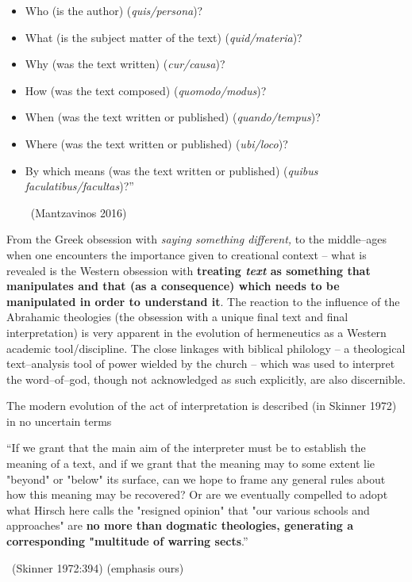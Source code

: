 \begin{itemize}
\itemsep=0pt
\item Who (is the author) (\textit{quis/persona})?

 \item What (is the subject matter of the text) (\textit{quid/materia})?

 \item Why (was the text written) (\textit{cur/causa})?

 \item How (was the text composed) (\textit{quomodo/modus})?

 \item When (was the text written or published) (\textit{quando/tempus})?

 \item Where (was the text written or published) (\textit{ubi/loco})?

 \item By which means (was the text written or published) (\textit{quibus faculatibus/facultas})?”

~\hfill (Mantzavinos 2016)

\end{itemize}

From the Greek obsession with \textit{saying something different,} to the middle–ages when one encounters the importance given to creational context – what is revealed is the Western obsession with \textbf{treating \textit{text} as something that manipulates and that (as a consequence) which needs to be manipulated in order to understand it}. The reaction to the influence of the Abrahamic theologies (the obsession with a unique final text and final interpretation) is very apparent in the evolution of hermeneutics as a Western academic tool/discipline. The close linkages with biblical philology – a theological text–analysis tool of power wielded by the church – which was used to interpret the word–of–god, though not acknowledged as such explicitly, are also discernible.

The modern evolution of the act of interpretation is described (in Skinner 1972) in no uncertain terms

\begin{myquote}
“If we grant that the main aim of the interpreter must be to establish the meaning of a text, and if we grant that the meaning may to some extent lie "beyond" or "below" its surface, can we hope to frame any general rules about how this meaning may be recovered? Or are we eventually compelled to adopt what Hirsch here calls the "resigned opinion" that "our various schools and approaches" are \textbf{no more than dogmatic theologies, generating a corresponding "multitude of warring sects}.”

~\hfill (Skinner 1972:394) (emphasis ours)
\end{myquote}


